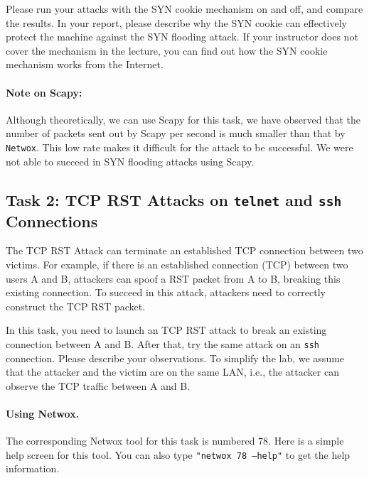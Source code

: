 Please run your attacks with the SYN cookie mechanism on and off,
and compare the results. In your report, please describe why 
the SYN cookie can effectively protect the machine against the 
SYN flooding attack. If your instructor does not cover the 
mechanism in the lecture, you can find out how the SYN cookie 
mechanism works from the Internet.



\paragraph{Note on Scapy:} Although theoretically, we can use Scapy for this task, we have
observed that the number of packets sent out by Scapy per second is much smaller than that by
\texttt{Netwox}. This low rate makes it difficult for the attack to be successful.   We were
not able to succeed in SYN flooding attacks using Scapy.



\subsection {Task 2: TCP RST Attacks on \texttt{telnet} and 
             \texttt{ssh} Connections}

The TCP RST Attack can terminate an established TCP connection between
two victims. For example, if there is an established \telnet connection (TCP)
between two users A and B, attackers can spoof a RST packet from A to B,
breaking this existing connection. To succeed in this attack, attackers
need to correctly construct the TCP RST packet. 

In this task, you need to launch an TCP RST attack to break an existing 
\telnet connection between A and B. After that,
try the same attack on an {\tt ssh} connection. Please describe
your observations.  To simplify the lab,
we assume that the attacker and the victim are on the same LAN,
i.e., the attacker can observe the TCP traffic between
A and B.


\paragraph{Using Netwox.} 
The corresponding Netwox tool for this task is numbered 78. Here is a
simple help screen for this tool. You can also type {\tt "netwox 78 --help"}
to get the help information.


